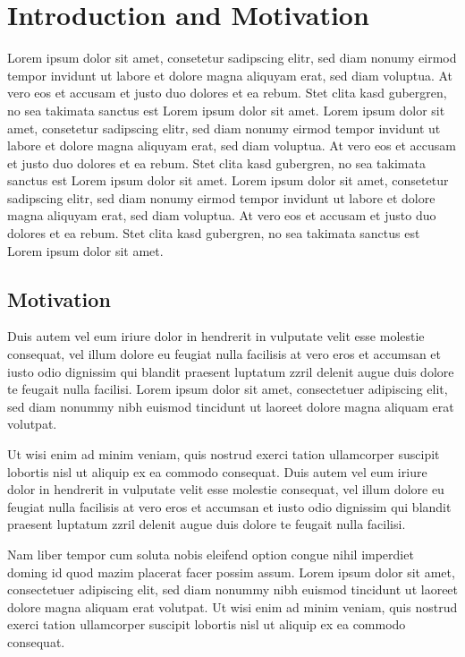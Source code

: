 %
\chapter{Introduction and Motivation}
\label{chap:introduction}
%
Lorem ipsum dolor sit amet, consetetur sadipscing elitr, sed diam nonumy eirmod 
tempor invidunt ut labore et dolore magna aliquyam erat, sed diam voluptua. At 
vero eos et accusam et justo duo dolores et ea rebum. Stet clita kasd gubergren,
no sea takimata sanctus est Lorem ipsum dolor sit amet. Lorem ipsum dolor sit
amet, consetetur sadipscing elitr, sed diam nonumy eirmod tempor invidunt ut 
labore et dolore magna aliquyam erat, sed diam voluptua. At vero eos et accusam 
et justo duo dolores et ea rebum. Stet clita kasd gubergren, no sea takimata 
sanctus est Lorem ipsum dolor sit amet. Lorem ipsum dolor sit amet, consetetur 
sadipscing elitr, sed diam nonumy eirmod tempor invidunt ut labore et dolore 
magna aliquyam erat, sed diam voluptua. At vero eos et accusam et justo duo 
dolores et ea rebum. Stet clita kasd gubergren, no sea takimata sanctus est
Lorem ipsum dolor sit amet. \cite{Script_pFEM}

%
\section{Motivation}
\label{sec:Motivation}
%
Duis autem vel eum iriure dolor in hendrerit in vulputate velit esse molestie 
consequat, vel illum dolore eu feugiat nulla facilisis at vero eros et accumsan 
et iusto odio dignissim qui blandit praesent luptatum zzril delenit augue duis 
dolore te feugait nulla facilisi. Lorem ipsum dolor sit amet, consectetuer 
adipiscing elit, sed diam nonummy nibh euismod tincidunt ut laoreet dolore magna
aliquam erat volutpat. \cite{Yosibash2007a}

Ut wisi enim ad minim veniam, quis nostrud exerci tation ullamcorper suscipit 
lobortis nisl ut aliquip ex ea commodo consequat. Duis autem vel eum iriure 
dolor in hendrerit in vulputate velit esse molestie consequat, vel illum dolore 
eu feugiat nulla facilisis at vero eros et accumsan et iusto odio dignissim qui 
blandit praesent luptatum zzril delenit augue duis dolore te feugait nulla 
facilisi. \cite{Knuth1997}

Nam liber tempor cum soluta nobis eleifend option congue nihil imperdiet doming 
id quod mazim placerat facer possim assum. Lorem ipsum dolor sit amet, 
consectetuer adipiscing elit, sed diam nonummy nibh euismod tincidunt ut 
laoreet dolore magna aliquam erat volutpat. Ut wisi enim ad minim veniam, quis 
nostrud exerci tation ullamcorper suscipit lobortis nisl ut aliquip ex ea 
commodo consequat. \cite{Keyak1994}